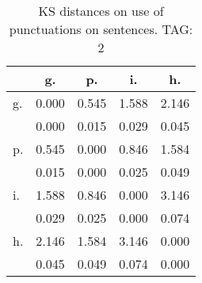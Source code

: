 \begin{table}[h!]
\begin{center}
\begin{tabular}{| l | c | c | c | c |}\hline
 & g. & p. & i. & h. \\\hline
g. & 0.000  & 0.545  & 1.588  & 2.146 \\\hline
 & 0.000  & 0.015  & 0.029  & 0.045 \\\hline
p. & 0.545  & 0.000  & 0.846  & 1.584 \\\hline
 & 0.015  & 0.000  & 0.025  & 0.049 \\\hline
i. & 1.588  & 0.846  & 0.000  & 3.146 \\\hline
 & 0.029  & 0.025  & 0.000  & 0.074 \\\hline
h. & 2.146  & 1.584  & 3.146  & 0.000 \\\hline
 & 0.045  & 0.049  & 0.074  & 0.000 \\\hline
\end{tabular}
\caption{KS distances on use of punctuations on sentences. TAG: 2}
\end{center}
\end{table}